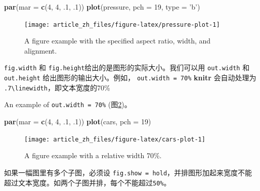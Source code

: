 \documentclass[]{article}
\newenvironment{Shaded}{\begin{snugshade}}{\end{snugshade}}
\newcommand{\DataTypeTok}[1]{\textcolor[rgb]{0.13,0.29,0.53}{#1}}
\newcommand{\DecValTok}[1]{\textcolor[rgb]{0.00,0.00,0.81}{#1}}
\newcommand{\FloatTok}[1]{\textcolor[rgb]{0.00,0.00,0.81}{#1}}
\newcommand{\KeywordTok}[1]{\textcolor[rgb]{0.13,0.29,0.53}{\textbf{#1}}}
\newcommand{\NormalTok}[1]{#1}
\newcommand{\StringTok}[1]{\textcolor[rgb]{0.31,0.60,0.02}{#1}}
\begin{document}
\begin{Shaded}
\begin{Highlighting}[]
\KeywordTok{par}\NormalTok{(}\DataTypeTok{mar =} \KeywordTok{c}\NormalTok{(}\DecValTok{4}\NormalTok{, }\DecValTok{4}\NormalTok{, }\FloatTok{.1}\NormalTok{, }\FloatTok{.1}\NormalTok{))}
\KeywordTok{plot}\NormalTok{(pressure, }\DataTypeTok{pch =} \DecValTok{19}\NormalTok{, }\DataTypeTok{type =} \StringTok{'b'}\NormalTok{)}
\end{Highlighting}
\end{Shaded}

\begin{figure}

{\centering \texttt{[image: article\_zh\_files/figure-latex/pressure-plot-1]} 

}

\caption{A figure example with the specified aspect ratio, width, and alignment.}\label{fig:pressure-plot}
\end{figure}

\texttt{fig.width} 和
\texttt{fig.height}给出的是图形的实际大小。我们可以用 \texttt{out.width}
和 \texttt{out.height} 给出图形的输出大小。例如，
\texttt{out.width\ =\ \textquotesingle{}70\%\textquotesingle{}}
\textbf{knitr} 会自动处理为
\texttt{.7\textbackslash{}linewidth}，即文本宽度的70\%

An example of \texttt{out.width\ =\ 70\%} (图\ref{fig:cars-plot})。

\begin{Shaded}
\begin{Highlighting}[]
\KeywordTok{par}\NormalTok{(}\DataTypeTok{mar =} \KeywordTok{c}\NormalTok{(}\DecValTok{4}\NormalTok{, }\DecValTok{4}\NormalTok{, }\FloatTok{.1}\NormalTok{, }\FloatTok{.1}\NormalTok{))}
\KeywordTok{plot}\NormalTok{(cars, }\DataTypeTok{pch =} \DecValTok{19}\NormalTok{)}
\end{Highlighting}
\end{Shaded}

\begin{figure}

{\centering \texttt{[image: article\_zh\_files/figure-latex/cars-plot-1]} 

}

\caption{A figure example with a relative width 70\%.}\label{fig:cars-plot}
\end{figure}

如果一幅图里有多个子图，必须设
\texttt{fig.show\ =\ \textquotesingle{}hold\textquotesingle{}}，并排图形加起来宽度不能超过文本宽度。如两个子图并排，每个不能超过\texttt{50\%}。
\end{document}

